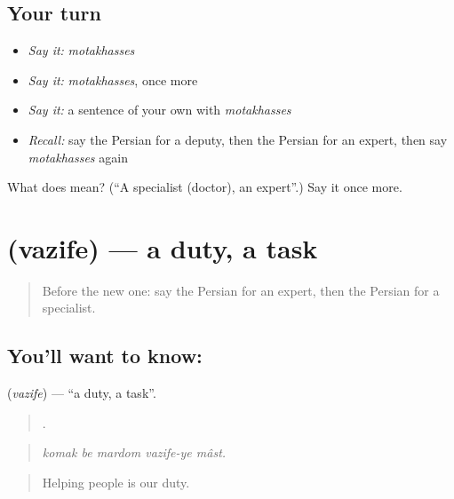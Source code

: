 \subsection*{Your turn}
\begin{itemize}
\raggedright
  \item \emph{Say it:} \emph{motakhasses}
  \item \emph{Say it:} \emph{motakhasses}, once more
  \item \emph{Say it:} a sentence of your own with \emph{motakhasses}
  \item \emph{Recall:} say the Persian for a deputy, then the Persian for an expert, then say \emph{motakhasses} again
\end{itemize}

\begin{tcolorbox}[breakable,colback=teal!4,colframe=teal!35!black,title={Before you move on}]
What does  mean? (\textquotedblleft{}A specialist (doctor), an expert\textquotedblright{}.) Say it once more.
\end{tcolorbox}
\section[\texorpdfstring{\fa{وظیفه} (vazife)}{وظیفه (vazife)}]{ (vazife) — a duty, a task}

\label{lesson:FA-C381-vazife}



\begin{quote}
Before the new one: say the Persian for an expert, then the Persian for a specialist.
\end{quote}

\subsection*{You'll want to know: }
\textbf{} (\emph{vazife}) — \textquotedblleft{}a duty, a task\textquotedblright{}.

\begin{quote}
    .
\end{quote}

\begin{quote}
\emph{komak be mardom vazife-ye mâst.}
\end{quote}

\begin{quote}
Helping people is our duty.
\end{quote}

